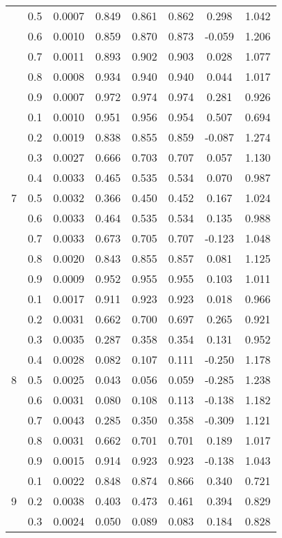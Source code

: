 \documentclass[11pt,a4paper]{report}
\begin{document}
\begin{longtable}{ | c | c || c | c | c | c | c | c | }
 & 0.5 & 0.0007 & 0.849 & 0.861 & 0.862 & 0.298 & 1.042 \\
 & 0.6 & 0.0010 & 0.859 & 0.870 & 0.873 & -0.059 & 1.206 \\
 & 0.7 & 0.0011 & 0.893 & 0.902 & 0.903 & 0.028 & 1.077 \\
 & 0.8 & 0.0008 & 0.934 & 0.940 & 0.940 & 0.044 & 1.017 \\
 & 0.9 & 0.0007 & 0.972 & 0.974 & 0.974 & 0.281 & 0.926 \\
 \hline
\multirow{9}{*}{7} & 0.1 & 0.0010 & 0.951 & 0.956 & 0.954 & 0.507 & 0.694 \\
 & 0.2 & 0.0019 & 0.838 & 0.855 & 0.859 & -0.087 & 1.274 \\
 & 0.3 & 0.0027 & 0.666 & 0.703 & 0.707 & 0.057 & 1.130 \\
 & 0.4 & 0.0033 & 0.465 & 0.535 & 0.534 & 0.070 & 0.987 \\
 & 0.5 & 0.0032 & 0.366 & 0.450 & 0.452 & 0.167 & 1.024 \\
 & 0.6 & 0.0033 & 0.464 & 0.535 & 0.534 & 0.135 & 0.988 \\
 & 0.7 & 0.0033 & 0.673 & 0.705 & 0.707 & -0.123 & 1.048 \\
 & 0.8 & 0.0020 & 0.843 & 0.855 & 0.857 & 0.081 & 1.125 \\
 & 0.9 & 0.0009 & 0.952 & 0.955 & 0.955 & 0.103 & 1.011 \\
 \hline
\multirow{9}{*}{8} & 0.1 & 0.0017 & 0.911 & 0.923 & 0.923 & 0.018 & 0.966 \\
 & 0.2 & 0.0031 & 0.662 & 0.700 & 0.697 & 0.265 & 0.921 \\
 & 0.3 & 0.0035 & 0.287 & 0.358 & 0.354 & 0.131 & 0.952 \\
 & 0.4 & 0.0028 & 0.082 & 0.107 & 0.111 & -0.250 & 1.178 \\
 & 0.5 & 0.0025 & 0.043 & 0.056 & 0.059 & -0.285 & 1.238 \\
 & 0.6 & 0.0031 & 0.080 & 0.108 & 0.113 & -0.138 & 1.182 \\
 & 0.7 & 0.0043 & 0.285 & 0.350 & 0.358 & -0.309 & 1.121 \\
 & 0.8 & 0.0031 & 0.662 & 0.701 & 0.701 & 0.189 & 1.017 \\
 & 0.9 & 0.0015 & 0.914 & 0.923 & 0.923 & -0.138 & 1.043 \\
 \hline
\multirow{9}{*}{9} & 0.1 & 0.0022 & 0.848 & 0.874 & 0.866 & 0.340 & 0.721 \\
 & 0.2 & 0.0038 & 0.403 & 0.473 & 0.461 & 0.394 & 0.829 \\
 & 0.3 & 0.0024 & 0.050 & 0.089 & 0.083 & 0.184 & 0.828 \\

\end{longtable}
\end{document}
